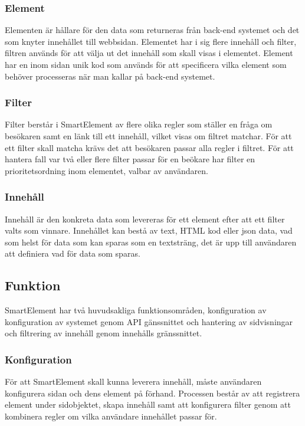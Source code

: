 \subsubsection{Element}

Elementen är hållare för den data som returneras från back-end systemet och det som knyter innehållet till webbsidan. Elementet har i sig flere innehåll och filter, filtren används för att välja ut det innehåll som skall visas i elementet. Element har en inom sidan unik kod som används för att specificera vilka element som behöver processeras när man kallar på back-end systemet.

\subsubsection{Filter}

Filter berstår i SmartElement av flere olika regler som ställer en fråga om besökaren samt en länk till ett innehåll, vilket visas om filtret matchar. För att ett filter skall matcha krävs det att besökaren passar alla regler i filtret. För att hantera fall var två eller flere filter passar för en beökare har filter en prioritetsordning inom elementet, valbar av användaren.

\subsubsection{Innehåll}

Innehåll är den konkreta data som levereras för ett element efter att ett filter valts som vinnare. Innehållet kan bestå av text, HTML kod eller \gls{json} data, vad som helst för data som kan sparas som en textsträng, det är upp till användaren att definiera vad för data som sparas.

\subsection{Funktion}

SmartElement har två huvudsakliga funktionsområden, konfiguration av konfiguration av systemet genom API gänssnittet och hantering av sidvisningar och filtrering av innehåll genom innehålls gränssnittet.

\subsubsection{Konfiguration}

För att SmartElement skall kunna leverera innehåll, måste användaren konfigurera sidan och dens element på förhand. Processen består av att registrera element under sidobjektet, skapa innehåll samt att konfigurera filter genom att kombinera regler om vilka användare innehållet passar för.


